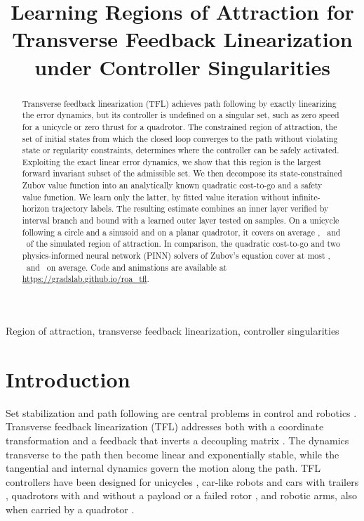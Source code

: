 \documentclass{l4dc2027}
\title[Learning regions of attraction for TFL]{Learning Regions of Attraction for Transverse Feedback Linearization under Controller Singularities}
\begin{document}
\maketitle

\vspace{-0.35in}

\begin{abstract}%
 Transverse feedback linearization (TFL) achieves path following by exactly linearizing the error dynamics, but its controller is undefined on a singular set, such as zero speed for a unicycle or zero thrust for a quadrotor. The constrained region of attraction, the set of initial states from which the closed loop converges to the path without violating state or regularity constraints, determines where the controller can be safely activated. Exploiting the exact linear error dynamics, we show that this region is the largest forward invariant subset of the admissible set. We then decompose its state-constrained Zubov value function into an analytically known quadratic cost-to-go and a safety value function. We learn only the latter, by fitted value iteration without infinite-horizon trajectory labels. The resulting estimate combines an inner layer verified by interval branch and bound with a learned outer layer tested on samples. On a unicycle following a circle and a sinusoid and on a planar quadrotor, it covers on average \resCovCircMean, \resCovSinMean\ and \resCovQuadMean\ of the simulated region of attraction. In comparison, the quadratic cost-to-go and two physics-informed neural network (PINN) solvers of Zubov's equation cover at most \resZubovMaxCirc, \resZubovMaxSin\ and \resZubovMaxQuad\ on average. Code and animations are available at \url{https://gradslab.github.io/roa_tfl}.%
\end{abstract}

\begin{keywords}%
Region of attraction, transverse feedback linearization, controller singularities%
\end{keywords}

\section{Introduction}\label{sec:intro}

 Set stabilization and path following are central problems in control and robotics \citep{nielsen2004,akhtar2015,allawati2026}. Transverse feedback linearization (TFL) addresses both with a coordinate transformation and a feedback that inverts a decoupling matrix \citep{nielsen2006,nielsen2008,akhtar2011}. The dynamics transverse to the path then become linear and exponentially stable, while the tangential and internal dynamics govern the motion along the path. TFL controllers have been designed for unicycles \citep{nielsen2004}, car-like robots and cars with trailers \citep{akhtar2011,akhtar2015,akhtar2011thesis}, quadrotors with and without a payload or a failed rotor \citep{roza2012,akhtar2012,akhtar2013,akhtar2022,akhtar2023,allawati2026,allawati2026ftc}, and robotic arms, also when carried by a quadrotor \citep{hladio2013,tariq2026}.
\end{document}
